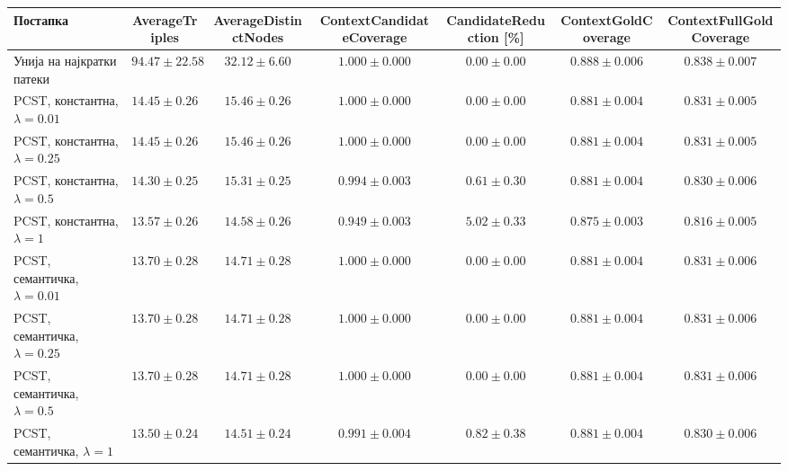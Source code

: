 \begin{tabular}{lcccccc}
\toprule
Постапка & AverageTriples & AverageDistinctNodes & ContextCandidateCoverage & CandidateReduction [\%] & ContextGoldCoverage & ContextFullGoldCoverage \\
\midrule
Унија на најкратки патеки & $94.47 \pm 22.58$ & $32.12 \pm 6.60$ & $1.000 \pm 0.000$ & $0.00 \pm 0.00$ & $0.888 \pm 0.006$ & $0.838 \pm 0.007$ \\
PCST, константна, $\lambda=0.01$ & $14.45 \pm 0.26$ & $15.46 \pm 0.26$ & $1.000 \pm 0.000$ & $0.00 \pm 0.00$ & $0.881 \pm 0.004$ & $0.831 \pm 0.005$ \\
PCST, константна, $\lambda=0.25$ & $14.45 \pm 0.26$ & $15.46 \pm 0.26$ & $1.000 \pm 0.000$ & $0.00 \pm 0.00$ & $0.881 \pm 0.004$ & $0.831 \pm 0.005$ \\
PCST, константна, $\lambda=0.5$ & $14.30 \pm 0.25$ & $15.31 \pm 0.25$ & $0.994 \pm 0.003$ & $0.61 \pm 0.30$ & $0.881 \pm 0.004$ & $0.830 \pm 0.006$ \\
PCST, константна, $\lambda=1$ & $13.57 \pm 0.26$ & $14.58 \pm 0.26$ & $0.949 \pm 0.003$ & $5.02 \pm 0.33$ & $0.875 \pm 0.003$ & $0.816 \pm 0.005$ \\
PCST, семантичка, $\lambda=0.01$ & $13.70 \pm 0.28$ & $14.71 \pm 0.28$ & $1.000 \pm 0.000$ & $0.00 \pm 0.00$ & $0.881 \pm 0.004$ & $0.831 \pm 0.006$ \\
PCST, семантичка, $\lambda=0.25$ & $13.70 \pm 0.28$ & $14.71 \pm 0.28$ & $1.000 \pm 0.000$ & $0.00 \pm 0.00$ & $0.881 \pm 0.004$ & $0.831 \pm 0.006$ \\
PCST, семантичка, $\lambda=0.5$ & $13.70 \pm 0.28$ & $14.71 \pm 0.28$ & $1.000 \pm 0.000$ & $0.00 \pm 0.00$ & $0.881 \pm 0.004$ & $0.831 \pm 0.006$ \\
PCST, семантичка, $\lambda=1$ & $13.50 \pm 0.24$ & $14.51 \pm 0.24$ & $0.991 \pm 0.004$ & $0.82 \pm 0.38$ & $0.881 \pm 0.004$ & $0.830 \pm 0.006$ \\
\bottomrule
\end{tabular}
